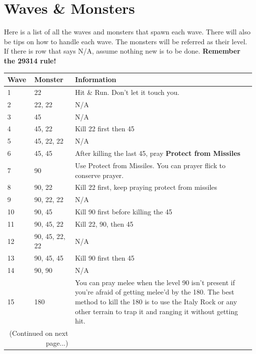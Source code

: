 \documentclass{article}
\begin{document}
\section{Waves \& Monsters}
Here is a list of all the waves and monsters that spawn each wave. There will also be tips on how to handle each wave. The monsters will be referred as their level. If there is row that says N/A, assume nothing new is to be done. \textbf{Remember the 29314 rule!}
\begin{table}[!htbt]
    \begin{tabular}{  l  p{3.4cm}  p{3.4cm} }
        \toprule
\textbf{Wave}      
& \textbf{Monster}   
& \textbf{Information} \\\midrule
1 & 22 & Hit \& Run. Don't let it touch you. \\\hline

2 & 22, 22 & N/A  \\\hline

3 & 45 & N/A \\\hline

4 & 45, 22 & Kill 22 first then 45 \\\hline

5 & 45, 22, 22 & N/A \\\hline

6 & 45, 45 & After killing the last 45, pray \textbf{Protect from Missiles} \\\hline

7 & 90 & Use Protect from Missiles. You can prayer flick to conserve prayer.\\\hline

8 & 90, 22 & Kill 22 first, keep praying protect from missiles \\\hline

9 & 90, 22, 22 & N/A \\\hline

10 & 90, 45 & Kill 90 first before killing the 45 \\\hline

11 & 90, 45, 22 & Kill 22, 90, then 45 \\\hline

12 & 90, 45, 22, 22 & N/A \\\hline

13
& 90, 45, 45
& Kill 90 first then 45 \\\hline

14
& 90, 90
& N/A \\\hline

15 
& 180
& You can pray melee when the level 90 isn't present if you're afraid of getting melee'd by the 180. The best method to kill the 180 is to use the Italy Rock or any other terrain to trap it and ranging it without getting hit. \\
        \bottomrule
        \multicolumn{2}{r}{\footnotesize(Continued on next page...)}
    \end{tabular}
\end{table}
\newpage
\end{document}
